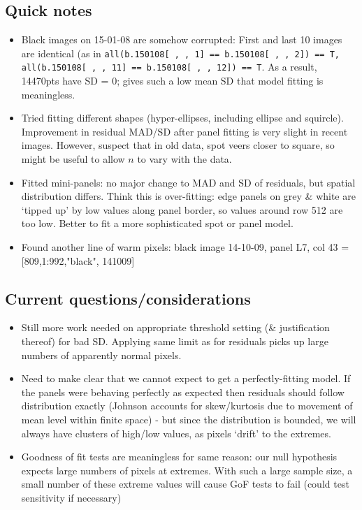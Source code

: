 \documentclass[10pt,fleqn]{article}
\begin{document}
\subsection*{Quick notes}

\begin{itemize}

\item
Black images on 15-01-08 are somehow corrupted: First and last 10 images are identical (as in \texttt{all(b.150108[ , , 1] == b.150108[ , , 2]) == T, all(b.150108[ , , 11] == b.150108[ , , 12]) == T}. As a result, 14470pts have SD = 0; gives such a low mean SD that model fitting is meaningless.
 
\item Tried fitting different shapes (hyper-ellipses, including ellipse and squircle). Improvement in residual MAD/SD after panel fitting is very slight in recent images. However, suspect that in old data, spot veers closer to square, so might be useful to allow $n$ to vary with the data.

\item Fitted mini-panels: no major change to MAD and SD of residuals, but spatial distribution differs. Think this is over-fitting: edge panels on grey \& white are `tipped up' by low values along panel border, so values around row 512 are too low. Better to fit a more sophisticated spot or panel model.

\item Found another line of warm pixels: black image 14-10-09, panel L7, col 43 = [809,1:992,"black", 141009]

\end{itemize}

\subsection*{Current questions/considerations}
\begin{itemize}

\item Still more work needed on appropriate threshold setting (\& justification thereof) for bad SD. Applying same limit as for residuals picks up large numbers of apparently normal pixels.

\item Need to make clear that we cannot expect to get a perfectly-fitting model. If the panels were behaving perfectly as expected then residuals should follow distribution exactly (Johnson accounts for skew/kurtosis due to movement of mean level within finite space) - but since the distribution is bounded, we will always have clusters of high/low values, as pixels `drift' to the extremes.

\item Goodness of fit tests are meaningless for same reason: our null hypothesis expects large numbers of pixels at extremes. With such a large sample size, a small number of these extreme values will cause GoF tests to fail (could test sensitivity if necessary)
\end{itemize}
\end{document}
